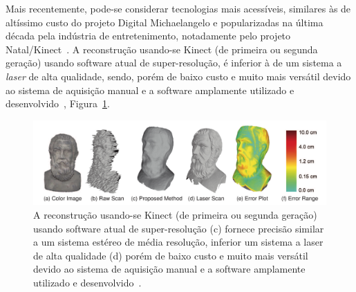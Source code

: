Mais recentemente, pode-se considerar tecnologias mais acessíveis, similares às
de altíssimo custo do projeto Digital Michaelangelo e popularizadas na última
década pela indústria de entretenimento, notadamente pelo projeto
Natal/Kinect~\cite{smisek20133d,wang2015research}. A reconstrução usando-se Kinect (de
primeira ou segunda geração) usando software atual de super-resolução, é
inferior à de um sistema a \emph{laser} de alta qualidade, sendo, porém de baixo custo
e muito mais versátil devido ao sistema de aquisição manual e a software
amplamente utilizado e desenvolvido~\cite{wang2015research},
Figura~\ref{fig:rec3d:comparacao}.


\begin{figure}[!h]
	\centering
	\includegraphics[width=1\linewidth]{figs/kinect-vs-usual.png}
	\caption{%
    A reconstrução usando-se Kinect (de primeira ou segunda geração) usando
    software atual de super-resolução (c) fornece precisão similar a um sistema estéreo de média
    resolução, inferior um sistema a laser de alta qualidade (d) porém de baixo custo e
    muito mais versátil devido ao sistema de aquisição manual e a software
    amplamente utilizado e
    desenvolvido~\cite{wang2015research}.
	}\label{fig:rec3d:comparacao}
\end{figure}

